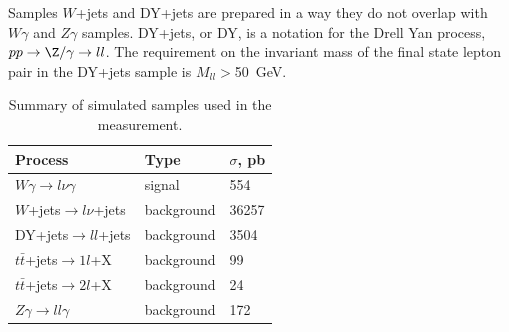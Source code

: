 
Samples $W$+jets and DY+jets are prepared in a way they do not overlap with $W\gamma$ and $Z\gamma$ samples. DY+jets, or DY, is a notation for the Drell Yan process, $pp\rightarrow\Z/\gamma\rightarrow ll$. The requirement on the invariant mass of the final state lepton pair in the DY+jets sample is $M_{ll}>$50~GeV. 

\begin{table}[h]
  \small
  \begin{center}
    \caption{Summary of simulated samples used in the measurement.}
    \begin{tabular}{|l|l|l|}
      \hline
      Process                              & Type & $\sigma$, pb  \\ \hline
      $W\gamma \rightarrow l\nu\gamma$     & signal & 554   \\ \hline %
      $W$+jets$ \rightarrow l\nu $+jets   & background & 36257  \\ \hline %
      DY+jets$ \rightarrow ll $+jets     & background & 3504  \\ \hline %
      $t\bar{t}$+jets$\rightarrow 1l$+X    & background & 99    \\ \hline %
      $t\bar{t}$+jets$\rightarrow 2l$+X    & background & 24    \\ \hline
      $Z\gamma \rightarrow ll\gamma$       & background & 172   \\ \hline
    \end{tabular}
    \label{tab:mc_bkg_samples}
  \end{center}
\end{table} 



